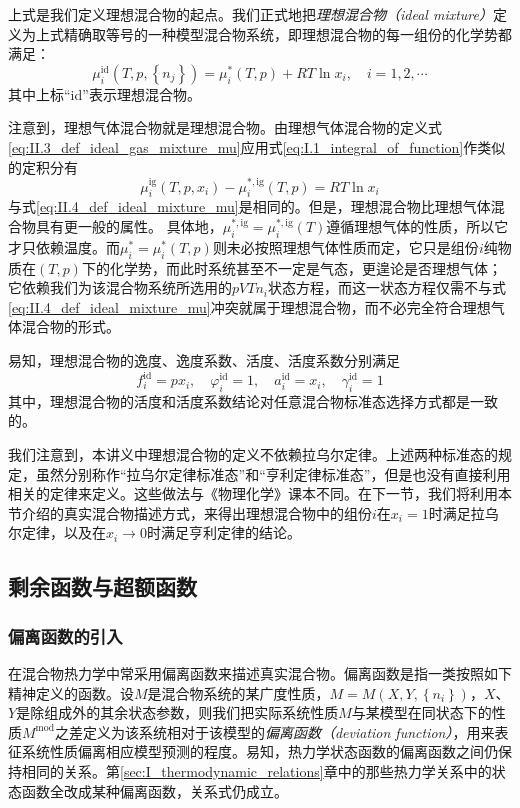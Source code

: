 \documentclass[main.tex]{subfiles}
\begin{document}
上式是我们定义理想混合物的起点。我们正式地把\emph{理想混合物（ideal mixture）}定义为上式精确取等号的一种模型混合物系统，即理想混合物的每一组份的化学势都满足：
\begin{equation}\label{eq:II.4_def_ideal_mixture_mu}
  \mu_i^\text{id}\left(T,p,\left\{n_j\right\}\right)=\mu_i^*\left(T,p\right)+RT\ln x_i,\quad i=1,2,\cdots
\end{equation}
其中上标“id”表示理想混合物。

注意到，理想气体混合物就是理想混合物。由理想气体混合物的定义式\eqref{eq:II.3_def_ideal_gas_mixture_mu}应用式\eqref{eq:I.1_integral_of_function}作类似的定积分有
\[\mu_i^\text{ig}\left(T,p,x_i\right)-\mu_i^{*,\text{ig}}\left(T,p\right)=RT\ln x_i\]
与式\eqref{eq:II.4_def_ideal_mixture_mu}是相同的。但是，理想混合物比理想气体混合物具有更一般的属性。 具体地，$\mu_i^{*,\text{ig}}=\mu_i^{*,\text{ig}}\left(T\right)$遵循理想气体的性质，所以它才只依赖温度。而$\mu_i^*=\mu_i^*\left(T,p\right)$则未必按照理想气体性质而定，它只是组份$i$纯物质在$\left(T,p\right)$下的化学势，而此时系统甚至不一定是气态，更遑论是否理想气体；它依赖我们为该混合物系统所选用的$pVTn_i$状态方程，而这一状态方程仅需不与式\eqref{eq:II.4_def_ideal_mixture_mu}冲突就属于理想混合物，而不必完全符合理想气体混合物的形式。

易知，理想混合物的逸度、逸度系数、活度、活度系数分别满足
\[f_i^\text{id}=px_i,\quad\varphi_i^\text{id}=1,\quad a_i^\text{id}=x_i,\quad\gamma_i^\text{id}=1\]
其中，理想混合物的活度和活度系数结论对任意混合物标准态选择方式都是一致的。

我们注意到，本讲义中理想混合物的定义不依赖拉乌尔定律。上述两种标准态的规定，虽然分别称作“拉乌尔定律标准态”和“亨利定律标准态”，但是也没有直接利用相关的定律来定义。这些做法与《物理化学》课本不同。在下一节，我们将利用本节介绍的真实混合物描述方式，来得出理想混合物中的组份$i$在$x_i=1$时满足拉乌尔定律，以及在$x_i\rightarrow 0$时满足亨利定律的结论。

\subsection{剩余函数与超额函数}
\subsubsection{偏离函数的引入}
在混合物热力学中常采用偏离函数来描述真实混合物。偏离函数是指一类按照如下精神定义的函数。设$M$是混合物系统的某广度性质，$M=M\left(X,Y,\left\{n_i\right\}\right)$，$X$、$Y$是除组成外的其余状态参数，则我们把实际系统性质$M$与某模型在同状态下的性质$M^\text{mod}$之差定义为该系统相对于该模型的\emph{偏离函数（deviation function）}，用来表征系统性质偏离相应模型预测的程度。易知，热力学状态函数的偏离函数之间仍保持相同的关系。第\ref{sec:I_thermodynamic_relations}章中的那些热力学关系中的状态函数全改成某种偏离函数，关系式仍成立。
\end{document}
